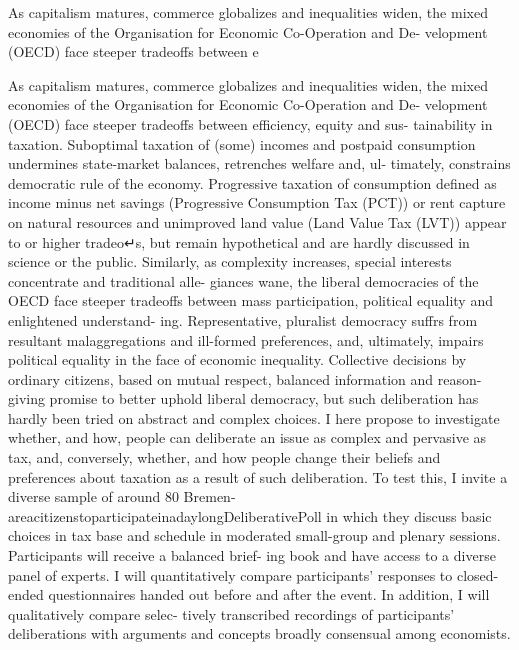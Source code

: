 
As capitalism matures, commerce globalizes and inequalities widen, the mixed economies of the Organisation for Economic Co-Operation and De- velopment (OECD) face steeper tradeoffs between e


As capitalism matures, commerce globalizes and inequalities widen, the mixed economies of the Organisation for Economic Co-Operation and De- velopment (OECD) face steeper tradeoffs between efficiency, equity and sus- tainability in taxation.
Suboptimal taxation of (some) incomes and postpaid consumption undermines state-market balances, retrenches welfare and, ul- timately, constrains democratic rule of the economy.
Progressive taxation of consumption defined as income minus net savings (Progressive Consumption Tax (PCT)) or rent capture on natural resources and unimproved land value (Land Value Tax (LVT)) appear to or higher tradeo↵s, but remain hypothetical and are hardly discussed in science or the public.
Similarly, as complexity increases, special interests concentrate and traditional alle- giances wane, the liberal democracies of the OECD face steeper tradeoffs between mass participation, political equality and enlightened understand- ing.
Representative, pluralist democracy suffrs from resultant malaggregations and ill-formed preferences, and, ultimately, impairs political equality in the face of economic inequality.
Collective decisions by ordinary citizens, based on mutual respect, balanced information and reason-giving promise to better uphold liberal democracy, but such deliberation has hardly been tried on abstract and complex choices.
I here propose to investigate whether, and how, people can deliberate an issue as complex and pervasive as tax, and, conversely, whether, and how people change their beliefs and preferences about taxation as a result of such deliberation.
To test this, I invite a diverse sample of around 80 Bremen-areacitizenstoparticipateinadaylongDeliberativePoll in which they discuss basic choices in tax base and schedule in moderated small-group and plenary sessions.
Participants will receive a balanced brief- ing book and have access to a diverse panel of experts.
I will quantitatively compare participants’ responses to closed-ended questionnaires handed out before and after the event.
In addition, I will qualitatively compare selec- tively transcribed recordings of participants’ deliberations with arguments and concepts broadly consensual among economists.
